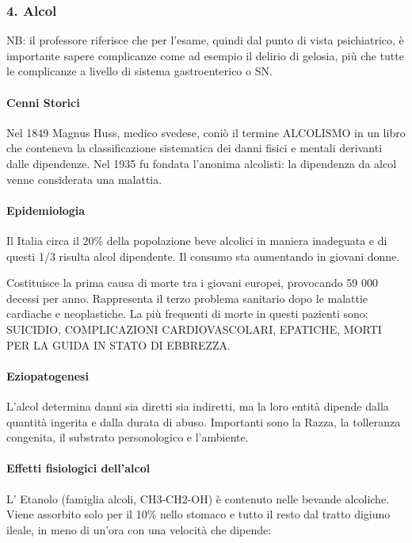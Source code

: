 \subsubsection{4. Alcol}

NB: il professore riferisce che per l'esame, quindi dal punto di vista
psichiatrico, è importante sapere complicanze come ad esempio il delirio
di gelosia, più che tutte le complicanze a livello di sistema
gastroenterico o SN.

\paragraph{Cenni Storici}

Nel 1849 Magnus Huss, medico svedese, coniò il termine ALCOLISMO in un
libro che conteneva la classificazione sistematica dei danni fisici e
mentali derivanti dalle dipendenze. Nel 1935 fu fondata l'anonima
alcolisti: la dipendenza da alcol venne considerata una malattia.

\paragraph{Epidemiologia}

Il Italia circa il 20\% della popolazione beve alcolici in maniera
inadeguata e di questi 1/3 risulta alcol dipendente. Il consumo sta
aumentando in giovani donne.

Costituisce la prima causa di morte tra i giovani europei, provocando 59
000 decessi per anno. Rappresenta il terzo problema sanitario dopo le
malattie cardiache e neoplastiche. La più frequenti di morte in questi
pazienti sono: SUICIDIO, COMPLICAZIONI CARDIOVASCOLARI, EPATICHE, MORTI
PER LA GUIDA IN STATO DI EBBREZZA.

\paragraph{Eziopatogenesi}

L'alcol determina danni sia diretti sia indiretti, ma la loro entità
dipende dalla quantità ingerita e dalla durata di abuso. Importanti sono
la Razza, la tolleranza congenita, il substrato personologico e
l'ambiente.

\paragraph{Effetti fisiologici dell'alcol}

L' Etanolo (famiglia alcoli, CH3-CH2-OH) è contenuto nelle bevande
alcoliche. Viene assorbito solo per il 10\% nello stomaco e tutto il
resto dal tratto digiuno ileale, in meno di un'ora con una velocità che
dipende:

